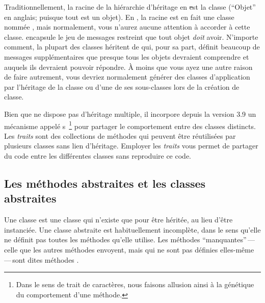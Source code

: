 \documentclass[a4paper,10pt,twoside]{book}
\begin{document}
Traditionnellement, la racine de la hi\'erarchie d'h\'eritage en \st est la classe  (``Objet'' en anglais; puisque tout est un objet).
En \squeak, la racine est en fait une classe nomm\'ee , mais
normalement, vous n'aurez aucune attention \`a accorder \`a cette classe.
 encapsule le jeu de messages restreint que tout objet \emph{doit} avoir.  
N'importe comment, la plupart des classes h\'eritent de  qui, pour
sa part, d\'efinit beaucoup de messages suppl\'ementaires que presque tous les
objets devraient comprendre et auquels ils devraient pouvoir r\'epondre.
\`A moins que vous ayez une autre raison de faire autrement, vous devriez
normalement g\'en\'erer des classes d'application par l'h\'eritage
de la classe  ou d'une de ses sous-classes lors de la cr\'eation de classe.



Bien que \squeak ne dispose pas d'h\'eritage multiple, il incorpore depuis la version 3.9 un m\'ecanisme appel\'e 
s~\footnote{Dans le sens de trait de caract\`eres, nous faisons allusion ainsi \`a la g\'en\'etique du comportement d'une m\'ethode.} 
pour partager le comportement entre des classes distincts.
Les \emph{traits} sont des collections de m\'ethodes qui peuvent \^etre r\'eutilis\'ees par plusieurs classes sans lien d'h\'eritage. Employer les \emph{traits} vous permet de partager du code entre les diff\'erentes classes sans reproduire ce code.

\subsection{Les m\'ethodes abstraites et les classes abstraites}

Une classe  est une classe qui n'existe que pour \^etre h\'erit\'ee, au lieu d'\^etre instanci\'ee.
Une classe abstraite est habituellement incompl\`ete, dans le sens qu'elle ne d\'efinit pas toutes les m\'ethodes qu'elle utilise.
Les m\'ethodes ``manquantes''\,---\,celle que les autres m\'ethodes envoyent, mais qui ne sont pas d\'efinies elles-m\^eme\,---\,sont dites m\'e\-tho\-des .
\end{document}
